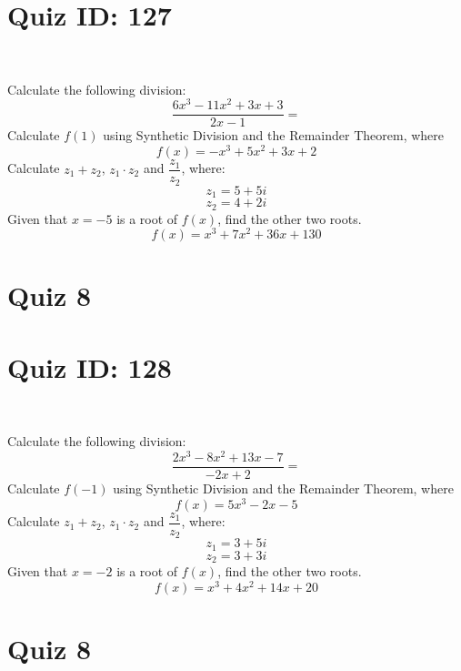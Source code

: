 \documentclass{exam}
\begin{document}
\section*{Quiz ID: 127}
\vspace{0.5cm}\
\vspace{1cm}\
\begin{questions}
\question Calculate the following division:\[\dfrac{
6x^3 - 11x^2 + 3x + 3}{
2x - 1}=\] \makeemptybox{\stretch{2}}
\question Calculate $f(1)$ using Synthetic Division and the Remainder Theorem, where\[f(x) = 
-x^3 + 5x^2 + 3x + 2\]
\newpage\question Calculate $z_1+z_2$, $z_1\cdot z_2$ and $\dfrac{z_1}{z_2}$, where:\[z_1=5+5\mathit{i}\]\[z_2=4+2\mathit{i}\]
\question Given that $x=-5$ is a root of $f(x)$, find the other two roots.\[f(x)=
x^3 + 7x^2 + 36x + 130\]\makeemptybox{\stretch{1}}
\end{questions}\newpage
\newpage
\section*{Quiz 8}
\section*{Quiz ID: 128}
\vspace{0.5cm}\
\vspace{1cm}\
\begin{questions}
\question Calculate the following division:\[\dfrac{
2x^3 - 8x^2 + 13x - 7}{
-2x + 2}=\] 
\question Calculate $f(-1)$ using Synthetic Division and the Remainder Theorem, where\[f(x) = 
5x^3 - 2x - 5\]
\newpage\question Calculate $z_1+z_2$, $z_1\cdot z_2$ and $\dfrac{z_1}{z_2}$, where:\[z_1=3+5\mathit{i}\]\[z_2=3+3\mathit{i}\]\makeemptybox{\stretch{1}}
\question Given that $x=-2$ is a root of $f(x)$, find the other two roots.\[f(x)=
x^3 + 4x^2 + 14x + 20\]\makeemptybox{\stretch{1}}
\end{questions}\newpage
\newpage
\section*{Quiz 8}
\end{document}
